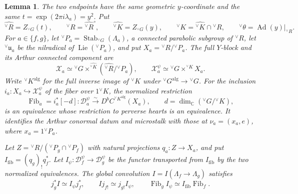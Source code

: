 \documentclass[10pt]{amsart}
\numberwithin{equation}{section}
\theoremstyle{plain}
\newtheorem{lemma}[proposition]{Lemma}
\theoremstyle{definition}
\theoremstyle{remark}
\DeclareMathOperator{\Stab}{Stab}
\DeclareMathOperator{\Lie}{Lie}
\newcommand{\CC}{\mathbb C}
\newcommand{\fu}{\mathfrak u}
\newcommand{\vG}{{}^{\vee}G}
\newcommand{\vR}{{}^{\vee}R}
\newcommand{\vK}{{}^{\vee}K}
\newcommand{\vP}{{}^{\vee}P}
\newcommand{\vfu}{{}^{\vee}\fu}
\newcommand{\vtheta}{{}^{\vee}\theta}
\newcommand{\alg}{\mathrm{alg}}
\begin{document}
\begin{lemma}\label{lem:fiber-model}
The two endpoints have the same geometric $y$-coordinate and the same
$t=\exp(2\pi i\lambda_a)=y^2$. Put
\[
 \widehat{\vR}=Z_{\vG}(t),\qquad
 \vR=\widehat{\vR}^{\circ},\qquad
 \widehat{\vK}=Z_{\vG}(y),\qquad
 \vK=\widehat{\vK}\cap\vR,
 \qquad \vtheta=\operatorname{Ad}(y)|_{\vR}.
\]
For $a\in\{f,g\}$, let $\vP_a=\Stab_{\vG}(\Lambda_a)$, a connected
parabolic subgroup of $\vR$, let $\vfu_a$ be the nilradical of
$\Lie(\vP_a)$, and put
$X_a=\vR/\vP_a$. The full $Y$-block and its Arthur connected component are
\begin{equation}\label{eq:full-and-Arthur-models}
 \mathcal X_a\simeq
 \vG\times^{\widehat{\vK}}(\widehat{\vR}/\vP_a),
 \qquad
 \mathcal X_a^\psi\simeq\vG\times^{\vK}X_a.
\end{equation}
Write $\vK^{\alg}$ for the full inverse image of $\vK$ under
$\vG^{\alg}\to\vG$. For the inclusion $i_a:X_a\hookrightarrow
\mathcal X_a^\psi$ of the fiber over $1\vK$, the normalized restriction
\[
 \operatorname{Fib}_a=i_a^*[-d]:\mathcal D_a^\psi
 \xrightarrow{\sim}D^bC^{\vK^{\alg}}(X_a),
 \qquad d=\dim_{\CC}(\vG/\vK),
\]
is an equivalence whose restriction to perverse hearts is an equivalence.
It identifies the Arthur conormal datum and microstalk with those at
$\nu_a=(x_a,e)$, where $x_a=1\vP_a$.

Let $Z=\vR/(\vP_g\cap\vP_f)$ with natural projections $q_a:Z\to X_a$,
and put $I_{\mathrm{fib}}=(q_g)_!q_f^*$. Let
$I_\psi:\mathcal D_f^\psi\to\mathcal D_g^\psi$ be the functor transported
from $I_{\mathrm{fib}}$ by the two normalized equivalences.
The global convolution $I=I(\Lambda_f\to\Lambda_g)$ satisfies
\begin{equation}\label{eq:component-convolution}
 j_g^* I\simeq I_\psi j_f^*,
 \qquad
 Ij_{f!}\simeq j_{g!}I_\psi,
 \qquad
 \operatorname{Fib}_g I_\psi\simeq
 I_{\mathrm{fib}}\operatorname{Fib}_f.
\end{equation}
\end{lemma}
\end{document}
